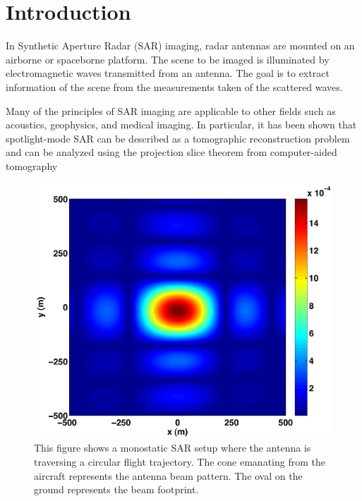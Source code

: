 \chapter{Introduction}

In Synthetic Aperture Radar (SAR) imaging, radar antennas are mounted on an airborne or spaceborne platform. The scene to be imaged is illuminated by electromagnetic waves transmitted from an antenna. The goal is to extract information of the scene from the measurements taken of the scattered waves.


Many of the principles of SAR imaging are applicable to other fields such as
acoustics, geophysics, and medical imaging. In particular, it has been shown
that spotlight-mode SAR can be described as a tomographic reconstruction problem
and can be analyzed using the projection slice theorem from computer-aided
tomography\cite{Garza:2011fk}

\begin{figure}
  \centering
  \includegraphics[scale=0.5]{figures/beamfootprint}
  \caption[Circular Bistatic SAR]{This figure shows a monostatic SAR setup where the antenna is traversing a circular flight trajectory. The cone emanating from the aircraft represents the antenna beam pattern.  The oval on the ground represents the beam footprint.}
  \label{fig:flyover}
\end{figure}

